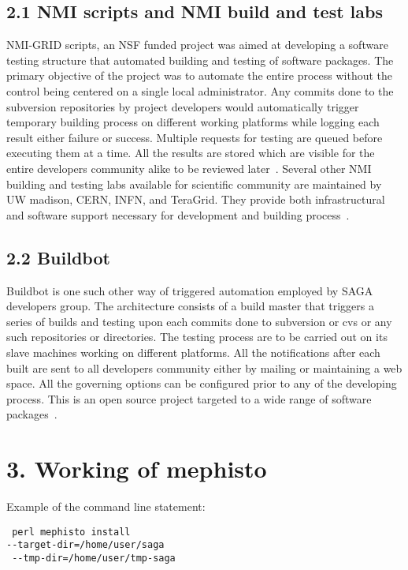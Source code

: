 \documentclass[a4paper,10pt]{article}
\begin{document}
\begin{multicols}{2}
\subsection*{\normalsize 2.1 NMI scripts and NMI build and test labs} 
NMI-GRID scripts, an NSF funded project was aimed at developing a software testing structure that automated building and testing of software packages. 
The primary objective of the project was to automate the entire process without the control being centered on a single local administrator. Any 
commits done to the subversion repositories by project developers would automatically trigger temporary building process on different working
platforms while logging each result either failure or success. Multiple requests for testing are queued before executing them at a time. All the results are 
stored which are visible for the entire developers community alike to be reviewed later~\cite{nmi-grids,nmi}. Several other NMI building and testing labs 
available for scientific community are maintained by UW madison, CERN, INFN, and TeraGrid. They provide both infrastructural and software support 
necessary for development and building process~\cite{nmi-build}.
\subsection*{\normalsize 2.2 Buildbot}
Buildbot is one such other way of triggered automation employed by SAGA developers group. The architecture consists of a build master that 
triggers a series of builds and testing upon each commits done to subversion or cvs or any such repositories or directories. The testing process 
are to be carried out on its slave machines working on different platforms. All the notifications after each built are sent to all developers community 
either by mailing or maintaining a web space. All the governing options can be configured prior to any of the developing process. This is an open source 
project targeted to a wide range of software packages~\cite{buildbot}.
\section*{\normalsize 3. Working of mephisto}
Example of the command line statement: 
\begin{verbatim} perl mephisto install 
--target-dir=/home/user/saga
 --tmp-dir=/home/user/tmp-saga \end{verbatim} 

\end{multicols}
\end{document}
